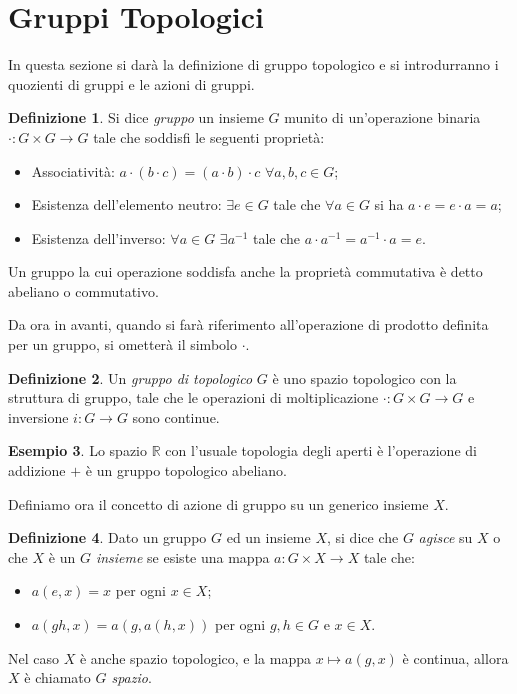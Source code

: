 \documentclass[12pt,a4paper]{report}
\theoremstyle{definition}
\newtheorem{Def}{Definizione}[chapter]
\theoremstyle{definition}
\newtheorem{Ex}[Def]{Esempio}
\theoremstyle{definition}
\theoremstyle{definition}
\begin{document}
\section{Gruppi Topologici}
In questa sezione si darà la definizione di gruppo topologico e si introdurranno i quozienti di gruppi e le azioni di gruppi.
\begin{Def}
	Si dice \textit{gruppo} un insieme $G$ munito di un'operazione binaria $\cdot:G\times G\rightarrow G$ tale che soddisfi le seguenti proprietà:
	\begin{itemize}
		\item Associatività: $a\cdot (b\cdot c)=(a\cdot b)\cdot c$ $\forall a,b,c\in G$;
		\item Esistenza dell'elemento neutro: $\exists e\in G$ tale che $\forall a\in G$ si ha $a\cdot e=e\cdot a=a$;
		\item Esistenza dell'inverso: $\forall a\in G$ $\exists a^{-1}$ tale che $a\cdot a^{-1}=a^{-1}\cdot a=e$.
	\end{itemize}
	Un gruppo la cui operazione soddisfa anche la proprietà commutativa è detto abeliano o commutativo.
\end{Def}
Da ora in avanti, quando si farà riferimento all'operazione di prodotto definita per un gruppo, si ometterà il simbolo $\cdot$.\\
\begin{Def}
	Un \textit{gruppo di topologico} $G$ è uno spazio topologico con la struttura di gruppo, tale che le operazioni di moltiplicazione $\cdot:G\times G\rightarrow G$ e inversione $i:G\rightarrow G$ sono continue.
\end{Def}
\begin{Ex}
	Lo spazio $\mathbb{R}$ con l'usuale topologia degli aperti è l'operazione di addizione $+$ è un gruppo topologico abeliano.
\end{Ex}
Definiamo ora il concetto di azione di gruppo su un generico insieme $X$.
\begin{Def}
	Dato un gruppo $G$ ed un insieme $X$, si dice che $G$ \textit{agisce} su $X$ o che $X$ è un \textit{$G$ insieme} se esiste una mappa $a:G\times X\rightarrow X$ tale che:
	\begin{itemize}
		\item 	$a(e,x)=x$ per ogni $x\in X$;
		\item $a(gh,x)=a(g,a(h,x))$ per ogni $g,h\in G$ e $x\in X$.
	\end{itemize} 
Nel caso $X$ è anche spazio topologico, e la mappa $x\longmapsto a(g,x)$ è continua, allora $X$ è chiamato \textit{$G$ spazio}.
\end{Def}
\end{document}

